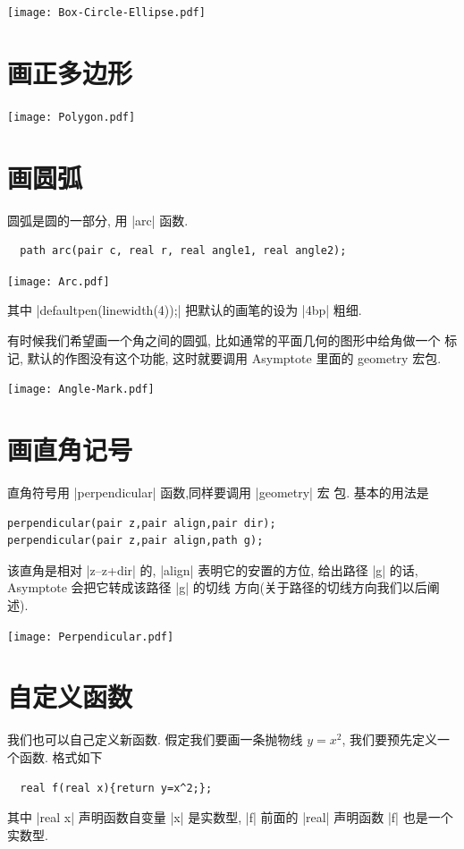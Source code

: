 \documentclass[nofonts,CJKnormalspaces]{ctexbook}[2009/05/20]
\begin{document}
\begin{center}\texttt{[image: Box-Circle-Ellipse.pdf]}\end{center}%


\section{画正多边形}
\begin{center}\texttt{[image: Polygon.pdf]}\end{center}%


\section{画圆弧}
圆弧是圆的一部分, 用 |arc| 函数.
\begin{lstlisting}
  path arc(pair c, real r, real angle1, real angle2);
\end{lstlisting}

\begin{center}\texttt{[image: Arc.pdf]}\end{center}%


其中 |defaultpen(linewidth(4));| 把默认的画笔的设为 |4bp| 粗细.

有时候我们希望画一个角之间的圆弧, 比如通常的平面几何的图形中给角做一个
标记, 默认的作图没有这个功能, 这时就要调用 Asymptote 里面的 geometry 宏包.
\begin{center}\texttt{[image: Angle-Mark.pdf]}\end{center}%


\section{画直角记号}
直角符号用 |perpendicular| 函数,同样要调用 |geometry| 宏
包. 基本的用法是
\begin{verbatim}
perpendicular(pair z,pair align,pair dir);
perpendicular(pair z,pair align,path g);
\end{verbatim}
该直角是相对 |z--z+dir| 的, |align| 表明它的安置的方位,
给出路径 |g| 的话, Asymptote 会把它转成该路径 |g| 的切线
方向(关于路径的切线方向我们以后阐述).
\begin{center}\texttt{[image: Perpendicular.pdf]}\end{center}%


\section{自定义函数}
我们也可以自己定义新函数. 假定我们要画一条抛物线 $y=x^{2}$, 我们要预先定义一个函数. 格式如下
\begin{lstlisting}
  real f(real x){return y=x^2;};
\end{lstlisting}
其中 |real x| 声明函数自变量 |x| 是实数型, |f| 前面的
|real| 声明函数 |f| 也是一个实数型.
\end{document}
